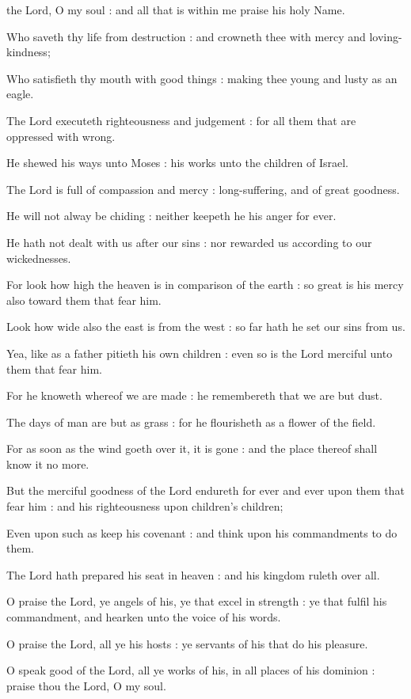 the Lord, O my soul : and all that is within me praise his holy Name.\par
{}
Who saveth thy life from destruction : and crowneth thee with mercy and loving-kindness;\par
{}Who satisfieth thy mouth with good things : making thee young and lusty as an eagle.\par
{}The Lord executeth righteousness and judgement : for all them that are oppressed with wrong.\par
{}He shewed his ways unto Moses : his works unto the children of Israel.\par
{}The Lord is full of compassion and mercy : long-suffering, and of great goodness.\par
{}He will not alway be chiding : neither keepeth he his anger for ever.\par
{}He hath not dealt with us after our sins : nor rewarded us according to our wickednesses.\par
{}For look how high the heaven is in comparison of the earth : so great is his mercy also toward them that fear him.\par
{}Look how wide also the east is from the west : so far hath he set our sins from us.\par
{}Yea, like as a father pitieth his own children : even so is the Lord merciful unto them that fear him.\par
{}For he knoweth whereof we are made : he remembereth that we are but dust.\par
{}The days of man are but as grass : for he flourisheth as a flower of the field.\par
{}For as soon as the wind goeth over it, it is gone : and the place thereof shall know it no more.\par
{}But the merciful goodness of the Lord endureth for ever and ever upon them that fear him : and his righteousness upon children's children;\par
{}Even upon such as keep his covenant : and think upon his commandments to do them.\par
{}The Lord hath prepared his seat in heaven : and his kingdom ruleth over all.\par
{}O praise the Lord, ye angels of his, ye that excel in strength : ye that fulfil his commandment, and hearken unto the voice of his words.\par
{}O praise the Lord, all ye his hosts : ye servants of his that do his pleasure.\par
{}O speak good of the Lord, all ye works of his, in all places of his dominion : praise thou the Lord, O my soul.\par


